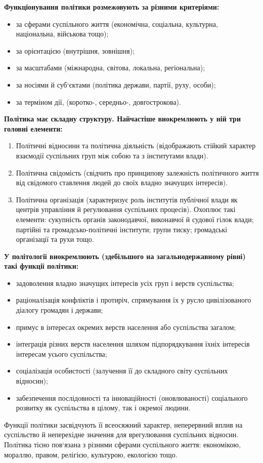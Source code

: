 \noindent\textbf{Функціонування політики розмежовують за різними критеріями:}
\begin{itemize}
\item за сферами суспільного життя (економічна, соціальна, культурна, національна, військова тощо);
\item за орієнтацією (внутрішня, зовнішня);
\item за масштабами (міжнародна, світова, локальна, регіональна);
\item за носіями й суб`єктами (політика держави, партії, руху, особи);
\item за терміном дії, (коротко-, середньо-, довгострокова).
\end{itemize}
\noindent\textbf{Політика має складну структуру. Найчастіше виокремлюють у ній три головні елементи:}
\begin{enumerate}
\item Політичні відносини та політична діяльність (відображають стійкий характер взаємодії суспільних груп між собою та з інститутами влади).
\item Політична свідомість (свідчить про принципову залежність політичного життя від свідомого ставлення людей до своїх владно значущих інтересів).
\item Політична організація (характеризує роль інститутів публічної влади як центрів управління й регулювання суспільних процесів). Охоплює такі елементи: сукупність органів законодавчої, виконавчої й судової гілок влади; партійні та громадсько-політичні інститути; групи тиску; громадські організації та рухи тощо.
\end{enumerate}
\noindent\textbf{У політології виокремлюють (здебільшого на загальнодержавному рівні) такі функції політики:}
\begin{itemize}
\item задоволення владно значущих інтересів усіх груп і верств суспільства;
\item раціоналізація конфліктів і протиріч, спрямування їх у русло цивілізованого діалогу громадян і держави;
\item примус в інтересах окремих верств населення або суспільства загалом;
\item інтеграція різних верств населення шляхом підпорядкування їхніх інтересів інтересам усього суспільства;
\item соціалізація особистості (залучення її до складного світу суспільних відносин);
\item забезпечення послідовності та інноваційності (оновлюваності) соціального розвитку як суспільства в цілому, так і окремої людини.
\end{itemize}
Функції політики засвідчують її всеосяжний характер, неперервний вплив на суспільство й неперехідне значення для врегулювання суспільних відносин. Політика тісно пов`язана з різними сферами суспільного життя: економікою, мораллю, правом, релігією, культурою, екологією тощо.


